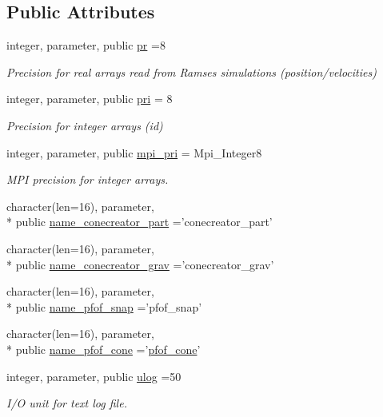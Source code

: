 \subsection*{Public Attributes}
\begin{DoxyCompactItemize}
\item 
integer, parameter, public \hyperlink{classmodconstant_ae56d6723f2d9f742f5e86130f933dc5a}{pr} =8
\begin{DoxyCompactList}\small\item\em Precision for real arrays read from Ramses simulations (position/velocities) \end{DoxyCompactList}\item 
integer, parameter, public \hyperlink{classmodconstant_a7a71c60a74ed2c5f33f51df2c6709c41}{pri} = 8
\begin{DoxyCompactList}\small\item\em Precision for integer arrays (id) \end{DoxyCompactList}\item 
integer, parameter, public \hyperlink{classmodconstant_a4717a1a875853ed2396e076e95fa12f1}{mpi\-\_\-pri} = Mpi\-\_\-\-Integer8
\begin{DoxyCompactList}\small\item\em M\-P\-I precision for integer arrays. \end{DoxyCompactList}\item 
character(len=16), parameter, \\*
public \hyperlink{classmodconstant_a8cb8268586070d3ab8e654e5d2a434f4}{name\-\_\-conecreator\-\_\-part} ='conecreator\-\_\-part'
\item 
character(len=16), parameter, \\*
public \hyperlink{classmodconstant_a6b0007da6df5318a91769f3130de6cb4}{name\-\_\-conecreator\-\_\-grav} ='conecreator\-\_\-grav'
\item 
character(len=16), parameter, \\*
public \hyperlink{classmodconstant_af7a0e90a75b8e13c6e6bcf434bafcd84}{name\-\_\-pfof\-\_\-snap} ='pfof\-\_\-snap'
\item 
character(len=16), parameter, \\*
public \hyperlink{classmodconstant_a79267a90db91d9d4ef5f6179a358a27d}{name\-\_\-pfof\-\_\-cone} ='\hyperlink{pfof__cone_8f90_addc770475dc2e497bf70a10ebc158aed}{pfof\-\_\-cone}'
\item 
integer, parameter, public \hyperlink{classmodconstant_ae996968f053a2ed978bda16dad601b9f}{ulog} =50
\begin{DoxyCompactList}\small\item\em I/\-O unit for text log file. \end{DoxyCompactList}\item 

\end{DoxyCompactItemize}
